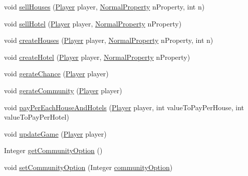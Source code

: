 \begin{DoxyCompactItemize}
\item 
void \hyperlink{class_monopoly_1_1_logic_1_1_game_a561bd44e9360ce74e13ebd21731a1028}{sell\+Houses} (\hyperlink{class_monopoly_1_1_logic_1_1_player}{Player} player, \hyperlink{class_monopoly_1_1_logic_1_1_normal_property}{Normal\+Property} n\+Property, int n)
\item 
void \hyperlink{class_monopoly_1_1_logic_1_1_game_a08a830d02dc40d9d7db469ea983b087e}{sell\+Hotel} (\hyperlink{class_monopoly_1_1_logic_1_1_player}{Player} player, \hyperlink{class_monopoly_1_1_logic_1_1_normal_property}{Normal\+Property} n\+Property)
\item 
void \hyperlink{class_monopoly_1_1_logic_1_1_game_af3970811aaf35107963296dc1027498b}{create\+Houses} (\hyperlink{class_monopoly_1_1_logic_1_1_player}{Player} player, \hyperlink{class_monopoly_1_1_logic_1_1_normal_property}{Normal\+Property} n\+Property, int n)
\item 
void \hyperlink{class_monopoly_1_1_logic_1_1_game_a98582c8754c164c49f32ea8d2a9e98c5}{create\+Hotel} (\hyperlink{class_monopoly_1_1_logic_1_1_player}{Player} player, \hyperlink{class_monopoly_1_1_logic_1_1_normal_property}{Normal\+Property} n\+Property)
\item 
void \hyperlink{class_monopoly_1_1_logic_1_1_game_af9d00f09d3612c52c7980710713fed21}{gerate\+Chance} (\hyperlink{class_monopoly_1_1_logic_1_1_player}{Player} player)
\item 
void \hyperlink{class_monopoly_1_1_logic_1_1_game_a14e8a8bc2aca1c01df75051511c7cc7b}{gerate\+Community} (\hyperlink{class_monopoly_1_1_logic_1_1_player}{Player} player)
\item 
void \hyperlink{class_monopoly_1_1_logic_1_1_game_a54ac92c333ef0c7c963df44bac9f8506}{pay\+Per\+Each\+House\+And\+Hotels} (\hyperlink{class_monopoly_1_1_logic_1_1_player}{Player} player, int value\+To\+Pay\+Per\+House, int value\+To\+Pay\+Per\+Hotel)
\item 
void \hyperlink{class_monopoly_1_1_logic_1_1_game_a62c4db7a3d1986bdd2e8f8b2938a5d63}{update\+Game} (\hyperlink{class_monopoly_1_1_logic_1_1_player}{Player} player)
\item 
Integer \hyperlink{class_monopoly_1_1_logic_1_1_game_a360b16bdaea39cbbcae7a317b20c44c0}{get\+Community\+Option} ()
\item 
void \hyperlink{class_monopoly_1_1_logic_1_1_game_ac21ca645765f0c387a86b8294eaac8d8}{set\+Community\+Option} (Integer \hyperlink{class_monopoly_1_1_logic_1_1_game_af554ecfbf29629088223f2b39fd30957}{community\+Option})
\item 

\end{DoxyCompactItemize}
